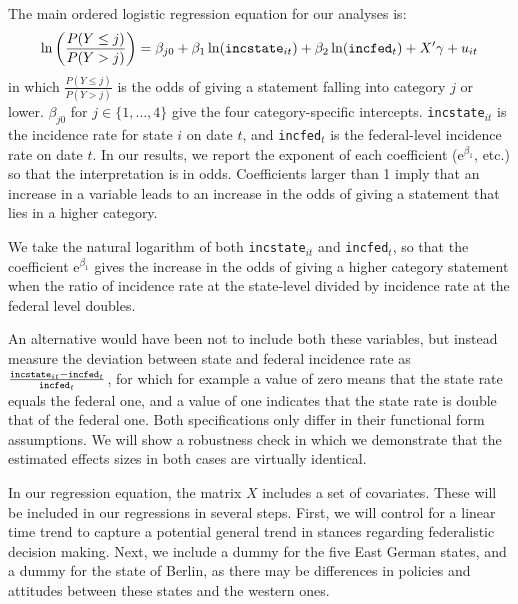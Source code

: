 \documentclass[12pt, abstract=true]{scrartcl}
\begin{document}
The main ordered logistic regression equation for our analyses is:
\begin{equation} \label{eq.regression01}
 \ln \left( \frac{P(Y \leq j)}{P(Y > j)} \right) = \beta_{j0} + \beta_1 \ln(\text{\texttt{incstate}}_{it}) + \beta_2 \ln(\text{\texttt{incfed}}_{t}) + X' \gamma + u_{it} 
\end{equation}
in which $\frac{P(Y \leq j)}{P(Y > j)}$ is the odds of giving a statement falling into category $j$ or lower. $\beta_{j0}$ for $j \in \{1,\ldots,4\}$ give the four category-specific intercepts. \texttt{incstate}$_{it}$ is the incidence rate for state $i$ on date $t$, and \texttt{incfed}$_{t}$ is the federal-level incidence rate on date $t$. In our results, we report the exponent of each coefficient ($\mathrm{e}^{\beta_1}$, etc.) so that the interpretation is in odds. Coefficients larger than 1 imply that an increase in a variable leads to an increase in the odds of giving a statement that lies in a higher category. 

We take the natural logarithm of both \texttt{incstate}$_{it}$ and \texttt{incfed}$_{t}$, so that the coefficient $\mathrm{e}^{\beta_1}$ gives the increase in the odds of giving a higher category statement when the ratio of incidence rate at the state-level divided by incidence rate at the federal level doubles.

An alternative would have been not to include both these variables, but instead measure the deviation between state and federal incidence rate as  $\frac{\text{\texttt{incstate}}_{it} - \text{\texttt{incfed}}_{t}}{\text{\texttt{incfed}}_{t}}$, for which for example a value of zero means that the state rate equals the federal one, and a value of one indicates that the state rate is double that of the federal one. Both specifications only differ in their functional form assumptions. We will show a robustness check in which we demonstrate that the estimated effects sizes in both cases are virtually identical.

In our regression equation, the matrix $X$ includes a set of covariates. These will be included in our regressions in several steps. First, we will control for a linear time trend to capture a potential general trend in stances regarding federalistic decision making. Next, we include a dummy for the five East German states, and a dummy for the state of Berlin, as there may be differences in policies and attitudes between these states and the western ones. 
\end{document}

